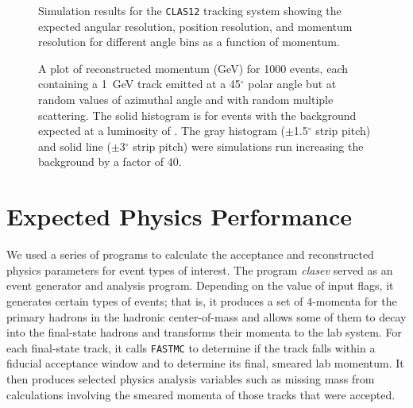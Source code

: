 \begin{figure}[htbp]
\vspace{12.0cm}
\caption{\small{Simulation results for the {\tt CLAS12} tracking system
showing the expected angular resolution, position resolution, and
momentum resolution for different angle bins as a function of momentum.}
\label{resol}}
\end{figure}

\begin{figure}[htpb]
\vspace{6.5cm}
\caption{\small{A plot of reconstructed momentum (GeV) for 1000 events,
each containing a 1~GeV track emitted at a 45$^{\circ}$ polar angle
but at random values of azimuthal angle and with random multiple
scattering.  The solid histogram is for events with the background 
expected at a luminosity of .  The gray histogram ($\pm$1.5$^{\circ}$
strip pitch) and solid line ($\pm$3$^{\circ}$ strip pitch) were
simulations run increasing the background by a factor of 40.}}
\label{resplot}
\end{figure}

\section{Expected Physics Performance}

We used a series of programs to calculate the acceptance and reconstructed 
physics parameters for event types of interest.  The program {\it clasev}
\cite{clasev} served as an event generator and analysis program. 
Depending on the value of input flags, it generates certain types of 
events; that is, it produces a set of 4-momenta for the primary hadrons 
in the hadronic center-of-mass and allows some of them to decay into the 
final-state hadrons and transforms their momenta to the lab system.  For 
each final-state track, it calls {\tt FASTMC} to determine if the track 
falls within a fiducial acceptance window and to determine its final, 
smeared lab momentum.  It then produces selected physics analysis variables 
such as missing mass from calculations involving the smeared momenta of 
those tracks that were accepted. 

